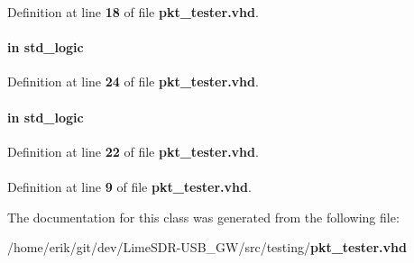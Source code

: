 Definition at line {\bf 18} of file {\bf pkt\+\_\+tester.\+vhd}.

\paragraph[{rdreq}]{ {\bfseries \textcolor{keywordflow}{in}\textcolor{vhdlchar}{ }} {\bfseries \textcolor{comment}{std\+\_\+logic}\textcolor{vhdlchar}{ }} \hspace{0.3cm}{\ttfamily [Port]}}\label{classpkt__tester_a664672374cb02f8b68a5ff0a74918b73}


Definition at line {\bf 24} of file {\bf pkt\+\_\+tester.\+vhd}.

\paragraph[{reset\+\_\+n}]{ {\bfseries \textcolor{keywordflow}{in}\textcolor{vhdlchar}{ }} {\bfseries \textcolor{comment}{std\+\_\+logic}\textcolor{vhdlchar}{ }} \hspace{0.3cm}{\ttfamily [Port]}}\label{classpkt__tester_a446ea52ed8c4a84181a47d9165ce41a5}


Definition at line {\bf 22} of file {\bf pkt\+\_\+tester.\+vhd}.

\paragraph[{std\+\_\+logic\+\_\+1164}]{\hspace{0.3cm}{\ttfamily [Package]}}\label{classpkt__tester_acd03516902501cd1c7296a98e22c6fcb}


Definition at line {\bf 9} of file {\bf pkt\+\_\+tester.\+vhd}.



The documentation for this class was generated from the following file\+:\begin{DoxyCompactItemize}
\item 
/home/erik/git/dev/\+Lime\+S\+D\+R-\/\+U\+S\+B\+\_\+\+G\+W/src/testing/{\bf pkt\+\_\+tester.\+vhd}\end{DoxyCompactItemize}
